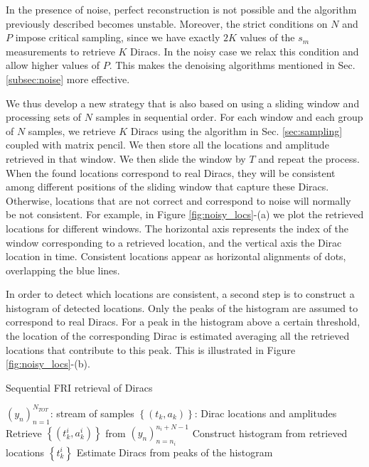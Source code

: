 \documentclass{article}
\begin{document}
In the presence of noise, perfect reconstruction is not possible and the algorithm
previously described becomes unstable. Moreover, the strict conditions on $N$ and 
$P$ impose critical sampling, since we have exactly $2K$ values of the $s_m$ 
measurements to retrieve $K$ Diracs. In the noisy case we relax this condition and allow
higher values of $P$. This makes the denoising algorithms mentioned in Sec. \ref{subsec:noise}
more effective.

We thus develop a new strategy that is also based on using a sliding window 
and processing sets of $N$ samples in sequential order. 
For each window and each group of $N$ samples, we retrieve $K$ Diracs using the 
algorithm in Sec. \ref{sec:sampling} coupled with matrix pencil.
We then store  
all the locations and amplitude retrieved in that window. 
We then slide the window by $T$ and repeat the process.
When the found locations correspond to real Diracs, they will be consistent among 
different positions of the sliding window that capture these Diracs. 
Otherwise, locations that are not correct and correspond to noise will normally be not consistent.
For example, in Figure \ref{fig:noisy_locs}-(a) we plot the retrieved locations 
for different windows. The horizontal axis represents the index of the window corresponding to a retrieved location,
and the vertical axis the Dirac location in time. Consistent locations appear as horizontal alignments 
of dots, overlapping the blue lines.

In order to detect which locations are consistent, a second step is to construct a 
histogram of detected locations. Only the peaks of the histogram are assumed 
to correspond to real Diracs. For a peak in the histogram above a certain threshold, 
the location of the corresponding Dirac is estimated averaging all the retrieved
locations that contribute to this peak. This is illustrated in Figure \ref{fig:noisy_locs}-(b).

\begin{algorithm}
\footnotesize
\caption{Sequential FRI retrieval of Diracs}
\label{algo:sequential_fri}
\begin{algorithmic}[1]
\REQUIRE $\left( y_n \right)_{n=1}^{N_{TOT}}$: stream of samples
\ENSURE  $\left\lbrace \left( t_k, a_k \right) \right\rbrace$: Dirac locations and amplitudes
\STATE Retrieve $\left\lbrace \left( t_k^i, a_k^i \right) \right\rbrace$ 
from $\left( y_n \right)_{n=n_i}^{n_i+N-1}$
\ENDFOR
\STATE Construct histogram from retrieved locations $\left\lbrace t_k^i\right\rbrace$
\STATE Estimate Diracs from peaks of the histogram
\end{algorithmic}
\end{algorithm}
\end{document}
